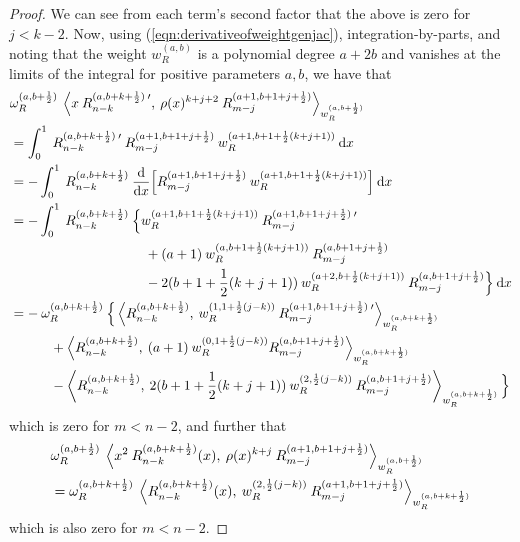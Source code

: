 \documentclass[11pt, oneside]{article}   	%
\newcommand{\half}{\frac{1}{2}}
\newcommand{\ddx}{\frac{\mathrm{d}}{\mathrm{d}x}}
\newcommand{\genjac}{R}
\newcommand{\genjacnmk}{\genjac_{n-k}}
\newcommand{\genjacmmj}{\genjac_{m-j}}
\newcommand{\genjacw}{w_\genjac}
\newcommand{\normgenjac}{\omega_\genjac}
\begin{document}
\begin{proof}
We can see  from each term's second factor that the above is zero for $j < k-2$. Now, using (\ref{eqn:derivativeofweightgenjac}), integration-by-parts, and noting that the weight $\genjacw^{(a,b)}$ is a polynomial degree $a+2b$ and vanishes at the limits of the integral for positive parameters $a,b$, we have that
\begin{align*}
	&\normgenjac^{(a, b+\half)} \: \ip< x \: \genjacnmk^{(a, b+k+\half) \: \prime}, \: \rho(x)^{k+j+2} \: \genjacmmj^{(a+1, b+1+j+\half)} >_{\genjacw^{(a, b+\half)}}  \\
	&= \int_0^1 \: \genjacnmk^{(a, b+k+\half) \: \prime} \: \genjacmmj^{(a+1, b+1+j+\half)} \: \genjacw^{(a+1, b+1+\half(k+j+1))} \: \D x \\
	&= - \int_0^1 \: \genjacnmk^{(a, b+k+\half)} \: \ddx \Big[ \genjacmmj^{(a+1, b+1+j+\half)} \: \genjacw^{(a+1, b+1+\half(k+j+1))} \Big] \: \D x \\
	&= - \int_0^1 \: \genjacnmk^{(a, b+k+\half)} \: \Big\{ \genjacw^{(a+1, b+1+\half(k+j+1))} \: \genjacmmj^{(a+1, b+1+j+\half) \: \prime} \\
	&\quad \quad \quad \quad \quad \quad \quad \quad \quad \quad + (a+1) \: \genjacw^{(a, b+1+\half(k+j+1))} \: \genjacmmj^{(a, b+1+j+\half)} \\
	&\quad \quad \quad \quad \quad \quad \quad \quad \quad \quad -2(b+1+\half(k+j+1)) \: \genjacw^{(a+2, b+\half(k+j+1))} \: \genjacmmj^{(a, b+1+j+\half)} \Big\} \: \D x \\
	&= - \: \normgenjac^{(a,b+k+\half)} \:  \Big\{ \ip<\genjacnmk^{(a, b+k+\half)}, \: \genjacw^{(1, 1+\half(j-k))} \: \genjacmmj^{(a+1, b+1+j+\half) \: \prime}>_{\genjacw^{(a, b+k+\half)}} \\
		&\quad \quad \quad + \ip<\genjacnmk^{(a, b+k+\half)}, \: (a+1) \: \genjacw^{(0,1+\half(j-k))} \genjacmmj^{(a, b+1+j+\half)} >_{\genjacw^{(a, b+k+\half)}} \\
		&\quad \quad \quad - \ip<\genjacnmk^{(a, b+k+\half)}, \: 2(b+1+\half(k+j+1)) \: \genjacw^{(2, \half(j-k))} \: \genjacmmj^{(a, b+1+j+\half)} >_{\genjacw^{(a, b+k+\half)}} \Big\}
\end{align*}
which is zero for $m < n - 2$, and further that
\begin{align*}
	&\normgenjac^{(a, b+\half)} \: \ip< x^2 \: \genjacnmk^{(a, b+k+\half)}(x), \: \rho(x)^{k+j} \: \genjacmmj^{(a+1, b+1+j+\half)} >_{\genjacw^{(a, b+\half)}} \\
	&= \normgenjac^{(a, b+k+\half)} \: \ip< \genjacnmk^{(a, b+k+\half)}(x), \: \genjacw^{(2, \half(j-k))} \: \genjacmmj^{(a+1, b+1+j+\half)} >_{\genjacw^{(a, b+k+\half)}}
\end{align*}
which is also zero for $m < n - 2$.


\end{proof}
\end{document}
